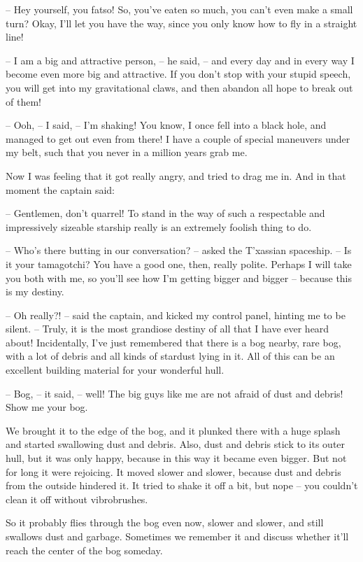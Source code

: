 \documentclass[ebook,twoside,final,openright]{memoir}
\begin{document}
– Hey yourself, you fatso! So, you’ve eaten so much, you can’t even make a small turn? Okay, I’ll let you have the way, since you only know how to fly in a straight line!\par
– I am a big and attractive person, – he said, – and every day and in every way I become even more big and attractive. If you don’t stop with your stupid speech, you will get into my gravitational claws, and then abandon all hope to break out of them!\par
– Ooh, – I said, – I’m shaking! You know, I once fell into a black hole, and managed to get out even from there! I have a couple of special maneuvers under my belt, such that you never in a million years grab me.\par
\par
Now I was feeling that it got really angry, and tried to drag me in. And in that moment the captain said:\par
– Gentlemen, don’t quarrel! To stand in the way of such a respectable and impressively sizeable starship really is an extremely foolish thing to do.\par
– Who’s there butting in our conversation? – asked the T'xassian spaceship. – Is it your tamagotchi? You have a good one, then, really polite. Perhaps I will take you both with me, so you’ll see how I’m getting bigger and bigger – because this is my destiny.\par
– Oh really?! – said the captain, and kicked my control panel, hinting me to be silent. – Truly, it is the most grandiose destiny of all that I have ever heard about! Incidentally, I’ve just remembered that there is a bog nearby, rare bog, with a lot of debris and all kinds of stardust lying in it. All of this can be an excellent building material for your wonderful hull.\par
– Bog, – it said, – well! The big guys like me are not afraid of dust and debris! Show me your bog.\par
\par
We brought it to the edge of the bog, and it plunked there with a huge splash and started swallowing dust and debris. Also, dust and debris stick to its outer hull, but it was only happy, because in this way it became even bigger. But not for long it were rejoicing. It moved slower and slower, because dust and debris from the outside hindered it. It tried to shake it off a bit, but nope – you couldn’t clean it off without vibrobrushes.\par
\par
So it probably flies through the bog even now, slower and slower, and still swallows dust and garbage. Sometimes we remember it and discuss whether it’ll reach the center of the bog someday.\par
\end{document}
